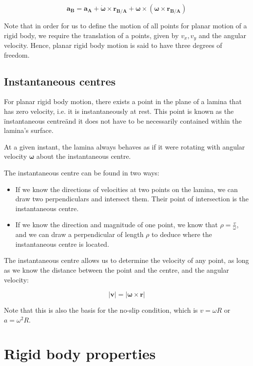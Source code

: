 \documentclass[12pt]{article}
\begin{document}
\[ \mathbf{a_B} = \mathbf{a_A} + \mathbf{\dot{\omega}} \times \mathbf{r_{B/A}} + \mathbf{\omega} \times (\mathbf{\omega} \times \mathbf{r_{B/A}}) \]

Note that in order for us to define the motion of all points for planar motion of a rigid body, we require the translation of a points, given by $v_x, v_y$ and the angular velocity. Hence, planar rigid body motion is said to have three degrees of freedom.

\subsection{Instantaneous centres}

\begin{definition}
    For planar rigid body motion, there exists a point in the plane of a lamina that has zero velocity, i.e. it is instantaneously at rest. This point is known as the \"instantaneous centre\" and it does not have to be necessarily contained within the lamina's surface. 

    At a given instant, the lamina always behaves as if it were rotating with angular velocity $\mathbf{\omega}$ about the instantaneous centre.
\end{definition}

The instantaneous centre can be found in two ways:

\begin{itemize}
    \item If we know the directions of velocities at two points on the lamina, we can draw two perpendiculars and intersect them. Their point of intersection is the instantaneous centre.
    \item If we know the direction and magnitude of one point, we know that $\rho = \frac{v}{\omega}$, and we can draw a perpendicular of length $\rho$ to deduce where the instantaneous centre is located.
\end{itemize}

The instantaneous centre allows us to determine the velocity of any point, as long as we know the distance between the point and the centre, and the angular velocity:

\[ \left|\mathbf{v}\right| = \left|\mathbf{\omega} \times \mathbf{r}\right| \]

Note that this is also the basis for the no-slip condition, which is $v = \omega R$ or $a = \omega^2R$.

\newpage

\section{Rigid body properties}
\end{document}
